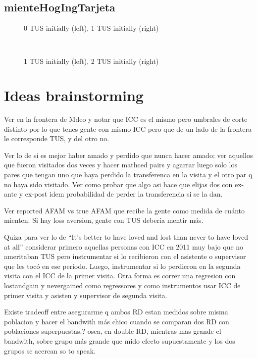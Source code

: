 \documentclass[12pt]{article}
\begin{document}
\subsection{mienteHogIngTarjeta}
\begin{figure}[H]%
	\centering
	\caption*{0 TUS initially (left), 1 TUS initially (right)}
	 \quad 
	 \\
	
	\caption*{1 TUS initially (left), 2 TUS initially (right)}
	 \qquad
	\label{fig:mienteHogIngTarjetaTwo}%
\end{figure}

\section{Ideas brainstorming}
Ver en la frontera de Mdeo y notar que ICC es el mismo pero umbrales de corte distinto por lo que tenes gente con mismo ICC pero que de un lado de la frontera le corresponde TUS, y del otro no.

Ver lo de si es mejor haber amado y perdido que nunca hacer amado: ver aquellos que fueron visitados dos veces y hacer mathced pairs y agarrar luego solo los pares que tengan uno que haya perdido la transferenca en la visita y el otro par q no haya sido visitado. Ver como probar que algo asi hace que elijas dos con ex-ante y ex-post idem probabilidad de perder la transferencia si se la dan.

Ver reported AFAM vs true AFAM que recibe la gente como medida de cuánto mienten. Si hay loss aversion, gente con TUS debería mentir más.

Quiza para ver lo de ``It's better to have loved and lost than never to have loved at all'' considerar primero aquellas personas con ICC en 2011 muy bajo que no ameritaban TUS pero instrumentar si lo recibieron con el asistente o supervisor que les tocó en ese período. Luego, instrumentar si lo perdieron en la segunda visita con el ICC de la primer visita. Otra forma es correr una regresion con lostandgain y nevergained como regressores y como instrumentos usar ICC de primer visita y asisten y supervisor de segunda visita.

Existe tradeoff entre asegurarme q ambos RD estan medidos sobre misma poblacion y hacer el bandwith más chico cuando se comparan dos RD con poblaciones superpuestas.? osea, en double-RD, mientras mas grande el bandwith, sobre grupo más grande que mido efecto supuestamente y los dos grupos se acercan so to speak.
\end{document}
